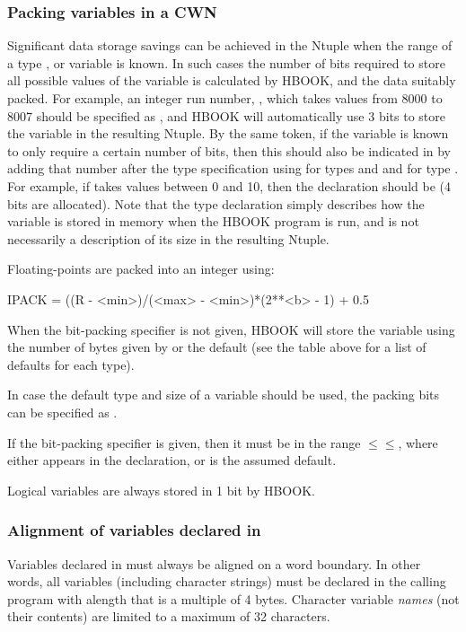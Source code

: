 \subsubsection{Packing variables in a CWN}
Significant data storage savings can be achieved in the Ntuple when the
range of a type ,  or  variable is known. In such cases
the number of bits required to store all possible values of the variable
is calculated by HBOOK, and the data suitably packed. For example, an integer
run number, , which takes values from 8000 to 8007 should be
specified as , and HBOOK will automatically use
3 bits to store the
variable in the resulting Ntuple. By the same token, if the variable is
known to only require a certain number of bits, then this should also be
indicated in  by adding that number after the type specification
using  for types 
and  and  for type . For example, if
 takes values between 0 and 10, then the declaration should be
 (4 bits are allocated). Note that the type declaration
simply describes how the variable is stored in memory when the HBOOK program
is run, and is not necessarily a description of its size in the resulting
Ntuple.

Floating-points are packed into an integer using:
\begin{XMP}
IPACK = ((R - <min>)/(<max> - <min>)*(2**<b> - 1) + 0.5
\end{XMP}

When the bit-packing specifier  is not given, HBOOK will store
the variable using the number of bytes given by  or the default (see
the table above for a list of defaults for each type).

In case the default type and size of a variable should be used, the
packing bits can be specified as .

If the bit-packing specifier is given, then it must be in the range
\(\le\)\(\le\), where  either
appears in the  declaration, or is the assumed default.

Logical variables are always stored in 1 bit by HBOOK.

\subsubsection{Alignment of variables declared in }
Variables declared in  must always be aligned on a word boundary.
In other words, all variables (including character strings) must be declared
in the calling program with alength that is a multiple of 4 bytes. Character
variable \textit{names} (not their contents) are limited to a maximum of 32
characters.

